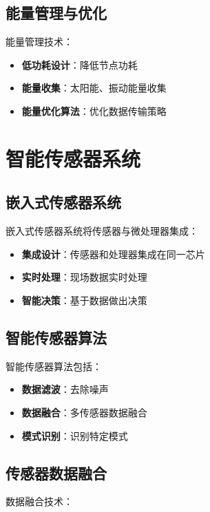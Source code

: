 \documentclass[12pt,UTF8]{ctexbook}
\begin{document}
\section{能量管理与优化}

能量管理技术：

\begin{itemize}[leftmargin=2cm]
	\item \textbf{低功耗设计}：降低节点功耗
	\item \textbf{能量收集}：太阳能、振动能量收集
	\item \textbf{能量优化算法}：优化数据传输策略
\end{itemize}

\chapter{智能传感器系统}

\section{嵌入式传感器系统}

嵌入式传感器系统将传感器与微处理器集成：

\begin{itemize}[leftmargin=2cm]
	\item \textbf{集成设计}：传感器和处理器集成在同一芯片
	\item \textbf{实时处理}：现场数据实时处理
	\item \textbf{智能决策}：基于数据做出决策
\end{itemize}

\section{智能传感器算法}

智能传感器算法包括：

\begin{itemize}[leftmargin=2cm]
	\item \textbf{数据滤波}：去除噪声
	\item \textbf{数据融合}：多传感器数据融合
	\item \textbf{模式识别}：识别特定模式
\end{itemize}

\section{传感器数据融合}

数据融合技术：
\end{document}
